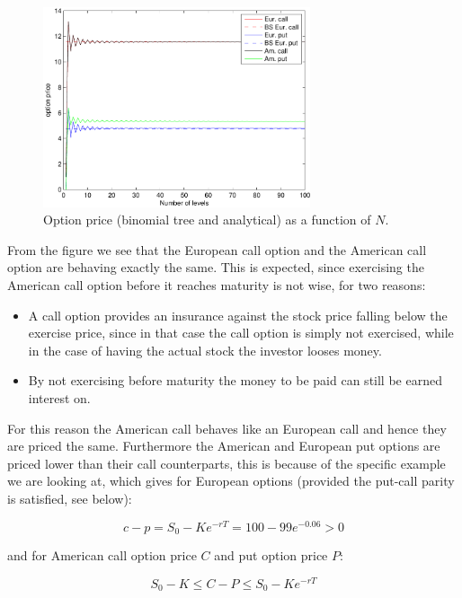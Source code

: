 \documentclass[11pt,a4paper]{article}
\begin{document}
\begin{figure}[H]
  \centering
  \includegraphics[width=0.7\textwidth]{conv.pdf}
  \caption{Option price (binomial tree and analytical) as a function of $N$.}
  \label{fig:conv}
\end{figure}

From the figure we see that the European call option and the American call option are behaving exactly the same. This is expected, since exercising the American call option before it reaches maturity is not wise, for two reasons:

\begin{itemize}
\item 
  A call option provides an insurance against the stock price falling below the exercise price, since in that case the call option is simply not exercised, while in the case of having the actual stock the investor looses money.
\item
  By not exercising before maturity the money to be paid can still be earned interest on.
\end{itemize}

For this reason the American call behaves like an European call and hence they are priced the same. Furthermore the American and European put options are priced lower than their call counterparts, this is because of the specific example we are looking at, which gives for European options (provided the put-call parity is satisfied, see below):

\begin{equation}
  c - p = S_{0} - K e^{-rT} = 100 - 99 e^{-0.06} > 0
\end{equation}

and for American call option price $C$ and put option price $P$:

\begin{equation}
  S_{0} - K \leq C - P \leq S_{0} - K e^{-rT}
\end{equation}
\end{document}
